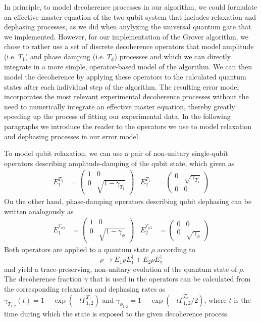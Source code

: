 In principle, to model decoherence processes in our algorithm, we could formulate an effective master equation of the two-qubit system that includes relaxation and dephasing processes, as we did when anylyzing the universal quantum gate that we implemented. However, for our implementation of the Grover algorithm, we chose to rather use a set of discrete decoherence operators that model amplitude (i.e. $T_1$) and phase damping (i.e. $T_\phi$) processes and which we can directly integrate in a more simple, operator-based model of the algorithm. We can then model the decoherence by applying these operators to the calculated quantum states after each individual step of the algorithm. The resulting error model incorporates the most relevant experimental decoherence processes without the need to numerically integrate an effective master equation, thereby greatly speeding up the process of fitting our experimental data. In the following paragraphs we introduce the reader to the operators we use to model relaxation and dephasing processes in our error model.

\smallskip

To model qubit relaxation, we can use a pair of non-unitary single-qubit operators describing amplitude-damping of the qubit state, which given as \citep{nielsen_quantum_2000}
%
\begin{align}
 E_1^{T_1} & = \left(\begin{array}{cc} 1 & 0 \\ 0 & \sqrt{1-\gamma_{T_1}} \end{array}\right)   &  E_2^{T_1}  & = \left( \begin{array}{cc} 0 & \sqrt{\gamma_{T_1}} \\ 0 & 0 \end{array} \right) \label{eq:grover_energy_relaxation}
\end{align}
%
On the other hand, phase-damping operators describing qubit dephasing can be written analogously as
%
\begin{align}
 E_1^{T_{\phi 1}} & = \left(\begin{array}{cc} 1 & 0 \\ 0 & \sqrt{1-\gamma_\phi} \end{array}\right)   &  E_2^{T_{\phi 1}}  & = \left( \begin{array}{cc} 0 & 0 \\ 0 & \sqrt{\gamma_\phi}  \end{array} \right) \label{eq:grover_phase_decoherence}
\end{align}
%
Both operators are applied to a quantum state $\rho$ according to
%
\begin{equation}
\rho \to E_1 \rho E_1^\dagger+E_2 \rho E_2^\dagger
\end{equation}
%
and yield a trace-preserving, non-unitary evolution of the quantum state of $\rho$. The decoherence fraction $\gamma$ that is used in the operators can be calculated from the corresponding relaxation and dephasing rates as $\gamma_{T_{1,2}}(t) = 1-\exp{\left(-t \Gamma_{1,2}^{T_1}\right)}$ and $\gamma_{\phi_{1,2}} = 1-\exp{\left(-t \Gamma_{1,2}^{T_\phi}/2\right)}$, where $t$ is the time during which the state is exposed to the given decoherence process.

